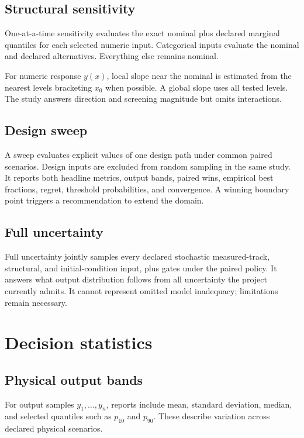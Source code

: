 \documentclass[11pt,oneside]{report}
\begin{document}
\section{Structural sensitivity}

One-at-a-time sensitivity evaluates the exact nominal plus declared marginal quantiles
for each selected numeric input.  Categorical inputs evaluate the nominal and declared
alternatives.  Everything else remains nominal.

For numeric response $y(x)$, local slope near the nominal is estimated from the nearest
levels bracketing $x_0$ when possible.  A global slope uses all tested levels.  The study
answers direction and screening magnitude but omits interactions.

\section{Design sweep}

A sweep evaluates explicit values of one design path under common paired scenarios.
Design inputs are excluded from random sampling in the same study.  It reports both
headline metrics, output bands, paired wins, empirical best fractions, regret, threshold
probabilities, and convergence.  A winning boundary point triggers a recommendation to
extend the domain.

\section{Full uncertainty}

Full uncertainty jointly samples every declared stochastic measured-track, structural,
and initial-condition input, plus gates under the paired policy.  It answers what output
distribution follows from all uncertainty the project currently admits.  It cannot
represent omitted model inadequacy; limitations remain necessary.

\chapter{Decision statistics}\label{ch:decision}

\section{Physical output bands}

For output samples $y_1,\ldots,y_n$, reports include mean, standard deviation, median,
and selected quantiles such as $p_{10}$ and $p_{90}$.  These describe variation across
declared physical scenarios.
\end{document}

